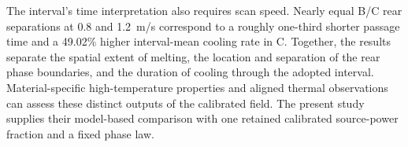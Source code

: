 The interval's time interpretation also requires scan speed. Nearly equal B/C rear separations at 0.8 and 1.2~m/s correspond to a roughly one-third shorter passage time and a 49.02\% higher interval-mean cooling rate in C. Together, the results separate the spatial extent of melting, the location and separation of the rear phase boundaries, and the duration of cooling through the adopted interval. Material-specific high-temperature properties and aligned thermal observations can assess these distinct outputs of the calibrated field. The present study supplies their model-based comparison with one retained calibrated source-power fraction and a fixed phase law.
